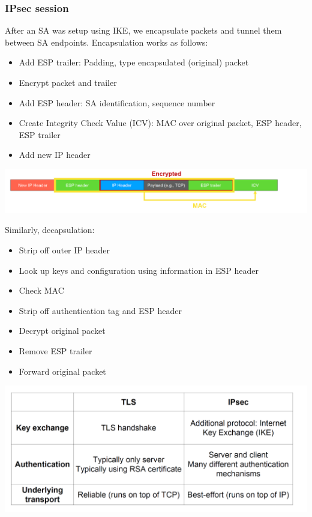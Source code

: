 \subsubsection{IPsec session}

After an SA was setup using IKE, we encapsulate packets and tunnel them between SA endpoints. Encapsulation works as follows:

\begin{itemize}
	\item Add ESP trailer: Padding, type encapsulated (original) packet
	\item Encrypt packet and trailer
	\item Add ESP header: SA identification, sequence number
	\item Create Integrity Check Value (ICV): MAC over original packet, ESP	header, ESP trailer
	\item Add new IP header
\end{itemize}

\begin{minipage}{\linewidth}
    \centering      
    \includegraphics[width=\linewidth]{Figures/VPN_session.PNG} 
\end{minipage}

Similarly, decapsulation:

\begin{itemize}
	\item Strip off outer IP header
	\item Look up keys and configuration using information in ESP header
	\item Check MAC
	\item Strip off authentication tag and ESP header
	\item Decrypt original packet
	\item Remove ESP trailer
	\item Forward original packet
\end{itemize}

\begin{minipage}{\linewidth}
    \centering      
    \includegraphics[width=\linewidth]{Figures/VPN_ipsec_tls.PNG} 
\end{minipage}

